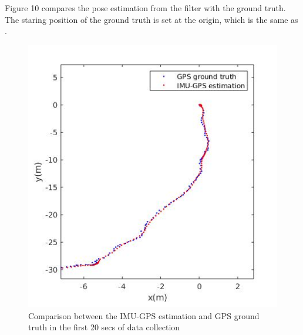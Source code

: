 Figure 10 compares the pose estimation from the filter with the ground truth. The staring position of the ground truth is set at the origin, which is the same as .

\begin{figure}[hbt!]
    \centering
    \includegraphics[width = 0.8\linewidth]{media/Starting_results.jpg}
    \caption{Comparison between the IMU-GPS estimation and GPS ground truth in the first 20 secs of data collection}
    \label{fig:odometry_angle_diff}
\end{figure}

